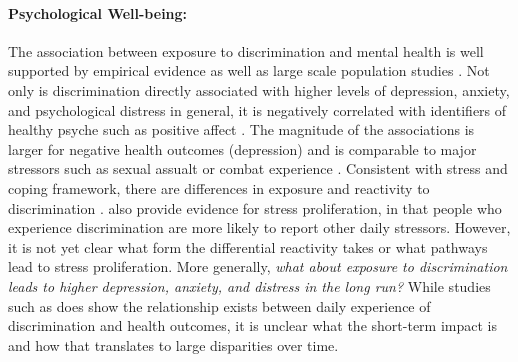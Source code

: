 \paragraph{Psychological Well-being:}
\label{sec:back-discrimination-mental}
%
The association between exposure to discrimination and mental health is well supported by empirical evidence \cite{Pascoe:2009} as well as large scale population studies \cite{Kessler:1999}. Not only is discrimination directly associated with higher levels of depression, anxiety, and psychological distress in general, it is negatively correlated with identifiers of healthy psyche such as positive affect \cite{Schmitt:2014}. The magnitude of the associations is larger for negative health outcomes (\eg depression) \cite{Schmitt:2014} and is comparable to major stressors such as sexual assualt or combat experience \cite{Kessler:1999}. Consistent with stress and coping framework, there are differences in exposure and reactivity to discrimination \cite{Kessler:1999}. %
\citet{Ong:2009} also provide evidence for stress proliferation, \eg in that people who experience discrimination are more likely to report other daily stressors. However, it is not yet clear what form the differential reactivity takes or what pathways lead to stress proliferation. More generally, \textit{what about exposure to discrimination leads to higher depression, anxiety, and distress in the long run?} While studies such as \citep{Ong:2009} does show the relationship exists between daily experience of discrimination and health outcomes, it is unclear what the short-term impact is and how that translates to large disparities over time. %

